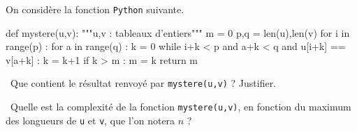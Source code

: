 On considère la fonction \texttt{Python} suivante. 
\begin{pyverbatim}
def mystere(u,v):
    """u,v : tableaux d'entiers"""
    m = 0
    p,q = len(u),len(v)
    for i in range(p) : 
        for a in range(q) :
	    k = 0
            while i+k < p and a+k < q and u[i+k] == v[a+k] : 
                k = k+1
            if k > m : 
                m = k
    return m
\end{pyverbatim}

\medskip

\question\ Que contient le résultat renvoyé par \texttt{mystere(u,v)} ? Justifier. 

\medskip

\question\ Quelle est la complexité de la fonction \texttt{mystere(u,v)}, en fonction du maximum des longueurs de \texttt{u} et \texttt{v}, que l'on notera $n$ ? 